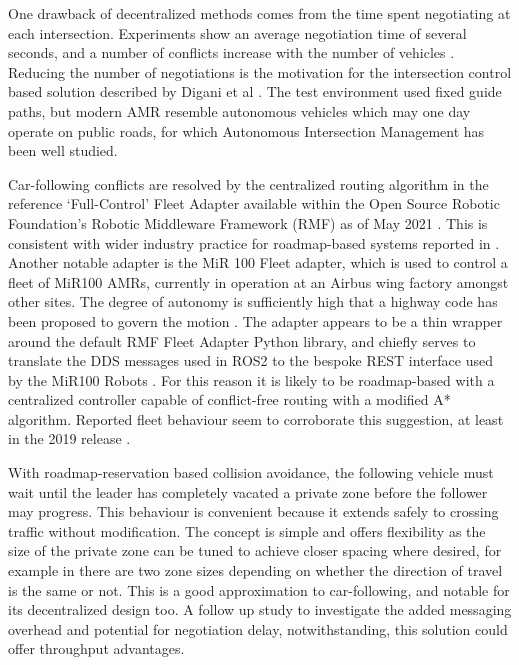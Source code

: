 \documentclass[runningheads]{llncs}
\begin{document}
One drawback of decentralized methods comes from the time spent negotiating at each intersection. Experiments show an average negotiation time of several seconds, and a number of conflicts increase with the number of vehicles \cite{Draganjac2020}. Reducing the number of negotiations is the motivation for the intersection control based solution described by Digani et al \cite{Digani2019}. The test environment used fixed guide paths, but modern AMR resemble autonomous vehicles which may one day operate on public roads, for which Autonomous Intersection Management has been well studied. 

Car-following conflicts are resolved by the centralized routing algorithm in the reference `Full-Control' Fleet Adapter available within the Open Source Robotic Foundation's Robotic Middleware Framework (RMF) as of May 2021 \cite{Vijay2021}. This is consistent with wider industry practice for roadmap-based systems reported in \cite{Fragapane2021}. Another notable adapter is the MiR 100 Fleet adapter, which is used to control a fleet of  MiR100 AMRs, currently in operation at an Airbus wing factory amongst other sites. The degree of autonomy is sufficiently high that a highway code has been proposed to govern the motion \cite{Liaqat2019}. The adapter appears to be a thin wrapper around the default RMF Fleet Adapter Python library, and chiefly serves to translate the DDS messages used in ROS2 \cite{Eros2019} to the bespoke REST interface used by the MiR100 Robots \cite{Grey2021}. For this reason it is likely to be roadmap-based with a centralized controller capable of conflict-free routing with a modified A* algorithm. Reported fleet behaviour seem to corroborate this suggestion, at least in the 2019 release \cite{Liaqat2019}.

With roadmap-reservation based collision avoidance, the following vehicle must wait until the leader has completely vacated a private zone before the follower may progress. This behaviour is convenient because it extends safely to crossing traffic without modification. The concept is simple and offers flexibility as the size of the private zone can be tuned to achieve closer spacing where desired, for example in \cite{Walenta2017} there are two zone sizes depending on whether the direction of travel is the same or not. This is a good approximation to car-following, and notable for its decentralized design too. A follow up study to investigate the added messaging overhead and potential for negotiation delay, notwithstanding, this solution could offer throughput advantages.
\end{document}
